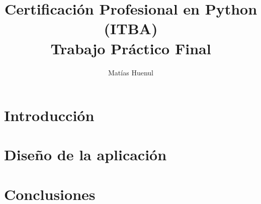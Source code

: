 \documentclass{article}
\title{Certificación Profesional en Python (ITBA) \\
Trabajo Práctico Final}
\author{Matías Huenul}
\date{}
\begin{document}
\maketitle
\tableofcontents
\newpage

\section{Introducción}

\section{Diseño de la aplicación}

\section{Conclusiones}



\end{document}

